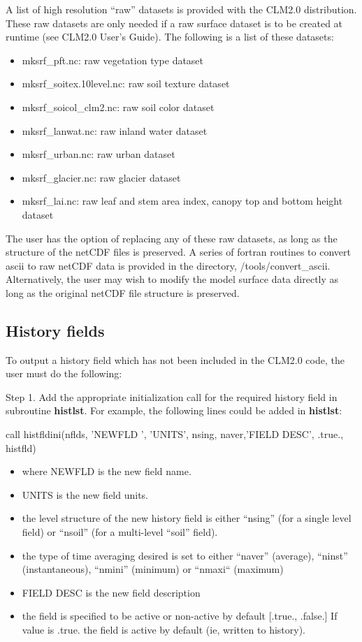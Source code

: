 \documentclass[]{article}
\begin{document}
A list of high resolution ``raw'' datasets is provided with the CLM2.0
distribution.  These raw datasets are only needed if a raw surface
dataset is to be created at runtime (see CLM2.0 User's Guide). The
following is a list of these datasets:

\begin{itemize}
\item mksrf\_pft.nc: raw vegetation type dataset 
\item mksrf\_soitex.10level.nc: raw soil texture dataset 
\item mksrf\_soicol\_clm2.nc: raw soil color dataset 
\item mksrf\_lanwat.nc: raw inland water dataset 
\item mksrf\_urban.nc: raw urban dataset 
\item mksrf\_glacier.nc: raw glacier dataset
\item mksrf\_lai.nc: raw leaf and stem area index, canopy top and bottom height dataset
\end{itemize}

The user has the option of replacing any of these raw datasets, as
long as the structure of the netCDF files is preserved. A series of
fortran routines to convert ascii to raw netCDF data is provided in
the directory, /tools/convert\_ascii.  Alternatively, the user may
wish to modify the model surface data directly as long as the original
netCDF file structure is preserved.

\subsection {History fields}

To output a history field which has not been included in the CLM2.0 code,
the user must do the following: \newline

\noindent 
Step 1. Add the appropriate initialization call for the required
history field in subroutine {\bf histlst}.  For example, 
the following lines could be added in {\bf histlst}:

\medskip
call histfldini(nflds, 'NEWFLD ', 'UNITS', nsing, naver,'FIELD DESC', .true., histfld) 
\newline

\noindent 
\begin{itemize}
\item where NEWFLD is the new field name. 
\item UNITS is the new field units. 
\item the level structure of the new history field is either ``nsing'' 
(for a single level field) or ``nsoil'' (for a multi-level ``soil''
field).
\item the type of time averaging desired is set to either
``naver'' (average), ``ninst'' (instantaneous), ``nmini'' (minimum)
or ``nmaxi`` (maximum)
\item FIELD DESC is the new field description
\item the field is specified to be active or non-active by default [.true., .false.] 
If value is .true. the field is active by default (ie, written to
history). \newline
\end{itemize}
\end{document}
